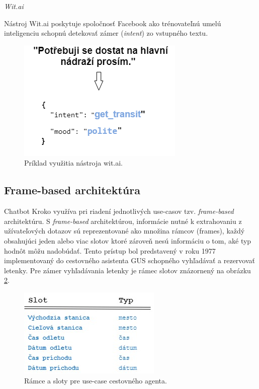 \documentclass{ExcelAtFIT}
\begin{document}
\vspace{5mm}
\textit{Wit.ai}

\noindent Nástroj Wit.ai poskytuje spoločnosť Facebook ako trénovateľnú umelú inteligenciu schopnú detekovať zámer (\emph{intent}) zo vstupného textu.

\begin{figure}[h]
	\centering
	\includegraphics[width=0.65\linewidth]{witai.png}
	\caption{Príklad využitia nástroja wit.ai.}
	\label{wit}
\end{figure}


\subsection{Frame-based architektúra}

Chatbot Kroko využíva pri riadení jednotlivých use-casov tzv. \emph{frame-based} architektúru.
S \emph{frame-based} architektúrou, informácie nutné k extrahovaniu z užívateľových dotazov sú reprezentované ako množina rámcov (frames), každý obsahujúci jeden alebo viac slotov ktoré zároveň nesú informáciu o tom, aké typ hodnôt môžu nadobúdať. \cite{jurafsky_2019}
Tento prístup bol predstavený v roku 1977 implementovaný do cestovného asistenta GUS schopného vyhľadávať a rezervovať letenky. Pre zámer vyhľadávania letenky je rámec slotov znázornený na obrázku \ref{alto}.

\begin{figure}[h]
  \centering
  \includegraphics[width=0.7\linewidth]{Slots.jpg}
  \caption{Rámce a sloty pre use-case cestovného agenta.}
  \label{alto}
\end{figure}
\end{document}

